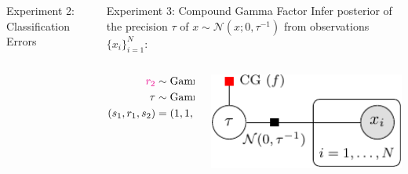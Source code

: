 \documentclass[english]{beamer}
\begin{document}
\begin{frame}
\begin{columns}[t]
\begin{block}{ Experiment 2: Classification Errors}
\end{block}

\begin{block}{ Experiment 3: Compound Gamma Factor }
    Infer posterior of the precision $\tau$ of $x \sim \mathcal{N}(x; 0, \tau^{-1})$ 
from observations $\{x_i\}_{i=1}^N $:
%
\noindent
\begin{columns}[T]
   \hspace{-5cm}
   \begin{column}{1cm}
       \begin{align*}
          \textcolor{magenta}{r_2} &\sim \mathrm{Gamma}(r_2; s_1, r_1)  \\
          \tau &\sim \mathrm{Gamma}(\tau; s_2, \textcolor{magenta}{r_2} ) \\
          (s_1, r_1, s_2) &= (1, 1, 1).
       \end{align*}
   \end{column}
   \hspace{-10cm}
   \begin{column}{1cm}
   \includegraphics[width=11cm]{img/compound_gamma_graph-crop}
   \end{column}
\end{columns}
%
\begin{figure}[ht]
  \centering
\end{figure}
\end{block}
\end{columns}
\end{frame}
\end{document}
